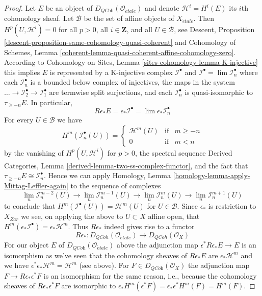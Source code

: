 \begin{proof}
\medskip\noindent
Let $E$ be an object of $D_{\textit{QCoh}}(\mathcal{O}_{\acute{e}tale})$
and denote $\mathcal{H}^i = H^i(E)$ its $i$th cohomology
sheaf. Let $\mathcal{B}$ be the set of affine objects of $X_{\acute{e}tale}$.
Then $H^p(U, \mathcal{H}^i) = 0$ for all $p > 0$, all $i \in \mathbf{Z}$,
and all $U \in \mathcal{B}$, see
Descent, Proposition \ref{descent-proposition-same-cohomology-quasi-coherent}
and
Cohomology of Schemes, Lemma
\ref{coherent-lemma-quasi-coherent-affine-cohomology-zero}.
According to
Cohomology on Sites, Lemma \ref{sites-cohomology-lemma-K-injective}
this implies $E$ is represented by a K-injective complex
$\mathcal{I}^\bullet$ and
$\mathcal{I}^\bullet = \lim \mathcal{I}_n^\bullet$ where
each $\mathcal{I}_n^\bullet$ is a bounded below complex of injectives,
the maps in the system
$\ldots \to \mathcal{I}_2^\bullet \to \mathcal{I}_1^\bullet$
are termwise split surjections, and each $\mathcal{I}_n^\bullet$ is
quasi-isomorphic to $\tau_{\geq -n}E$.
In particular,
$$
R\epsilon_*E = \epsilon_*\mathcal{I}^\bullet =
\lim \epsilon_*\mathcal{I}_n^\bullet
$$
For every $U \in \mathcal{B}$ we have
$$
H^m(\mathcal{I}_n^\bullet(U)) =
\left\{
\begin{matrix}
\mathcal{H}^m(U) & \text{if} & m \geq -n \\
0 & \text{if} & m < n
\end{matrix}
\right.
$$
by the vanishing of $H^p(U, \mathcal{H}^i)$ for $p > 0$,
the spectral sequence
Derived Categories, Lemma \ref{derived-lemma-two-ss-complex-functor}, and
the fact that $\tau_{\geq -n}E \cong \mathcal{I}_n^\bullet$. Hence we can apply
Homology, Lemma \ref{homology-lemma-apply-Mittag-Leffler-again}
to the sequence of complexes
$$
\lim_n \mathcal{I}_n^{m - 2}(U) \to
\lim_n \mathcal{I}_n^{m - 1}(U) \to
\lim_n \mathcal{I}_n^m(U) \to
\lim_n \mathcal{I}_n^{m + 1}(U)
$$
to conclude that $H^m(\mathcal{I}^\bullet(U)) = \mathcal{H}^m(U)$ for
$U \in \mathcal{B}$. Since $\epsilon_*$ is restriction
to $X_{Zar}$ we see, on applying the above to $U \subset X$
affine open, that
$H^m(\epsilon_*\mathcal{I}^\bullet) = \epsilon_*\mathcal{H}^m$.
Thus $R\epsilon_*$ indeed gives rise to a functor
$$
R\epsilon_* :
D_{QCoh}(\mathcal{O}_{\acute{e}tale})
\longrightarrow
D_{QCoh}(\mathcal{O}_X)
$$
For our object $E$ of $D_{\textit{QCoh}}(\mathcal{O}_{\acute{e}tale})$ above
the adjunction map $\epsilon^*R\epsilon_*E \to E$
is an isomorphism as we've seen that the cohomology sheaves
of $R\epsilon_*E$ are $\epsilon_*\mathcal{H}^m$ and we have
$\epsilon^*\epsilon_*\mathcal{H}^m = \mathcal{H}^m$ (see above).
For $F \in D_{\textit{QCoh}}(\mathcal{O}_X)$ the
adjunction map $F \to R\epsilon_*\epsilon^*F$
is an isomorphism for the same reason, i.e., because
the cohomology sheaves of $R\epsilon_*\epsilon^*F$
are isomorphic to
$\epsilon_*H^m(\epsilon^*F) = \epsilon_*\epsilon^*H^m(F) = H^m(F)$.
\end{proof}










